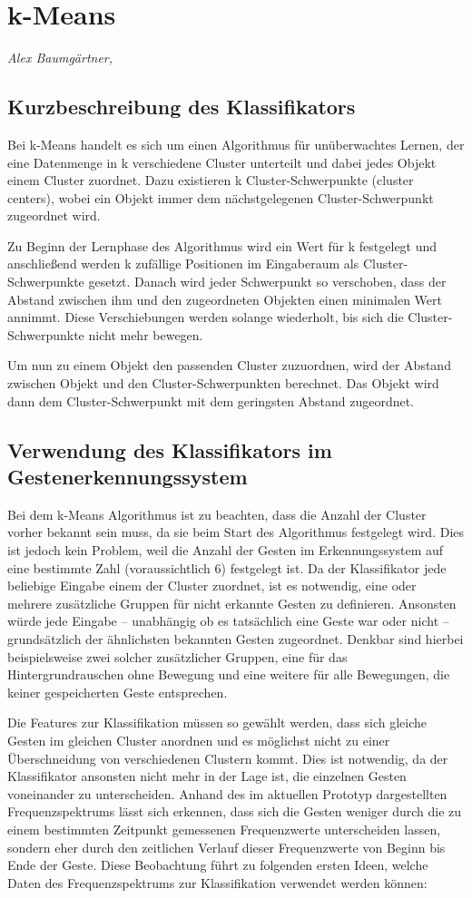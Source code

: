 \section{k-Means}
\textit{Alex Baumgärtner, }
\subsection{Kurzbeschreibung des Klassifikators}
Bei k-Means handelt es sich um einen Algorithmus für unüberwachtes Lernen, der eine Datenmenge in k verschiedene Cluster unterteilt und dabei jedes Objekt einem Cluster zuordnet. Dazu existieren k Cluster-Schwerpunkte (cluster centers), wobei ein Objekt immer dem nächstgelegenen Cluster-Schwerpunkt zugeordnet wird.

Zu Beginn der Lernphase des Algorithmus wird ein Wert für k festgelegt und anschließend werden k zufällige Positionen im Eingaberaum als Cluster-Schwerpunkte gesetzt. Danach wird jeder Schwerpunkt so verschoben, dass der Abstand zwischen ihm und den zugeordneten Objekten einen minimalen Wert annimmt. Diese Verschiebungen werden solange wiederholt, bis sich die Cluster-Schwerpunkte nicht mehr bewegen.

Um nun zu einem Objekt den passenden Cluster zuzuordnen, wird der Abstand zwischen Objekt und den Cluster-Schwerpunkten berechnet. Das Objekt wird dann dem Cluster-Schwerpunkt mit dem geringsten Abstand zugeordnet.


\subsection{Verwendung des Klassifikators im Gestenerkennungssystem}
Bei dem k-Means Algorithmus ist zu beachten, dass die Anzahl der Cluster vorher bekannt sein muss, da sie beim Start des Algorithmus festgelegt wird. Dies ist jedoch kein Problem, weil die Anzahl der Gesten im Erkennungssystem auf eine bestimmte Zahl (voraussichtlich 6) festgelegt ist. Da der Klassifikator jede beliebige Eingabe einem der Cluster zuordnet, ist es notwendig, eine oder mehrere zusätzliche Gruppen für nicht erkannte Gesten zu definieren. Ansonsten würde jede Eingabe – unabhängig ob es tatsächlich eine Geste war oder nicht – grundsätzlich der ähnlichsten bekannten Gesten zugeordnet. Denkbar sind hierbei beispielsweise zwei solcher zusätzlicher Gruppen, eine für das Hintergrundrauschen ohne Bewegung und eine weitere für alle Bewegungen, die keiner gespeicherten Geste entsprechen.

Die Features zur Klassifikation müssen so gewählt werden, dass sich gleiche Gesten im gleichen Cluster anordnen und es möglichst nicht zu einer Überschneidung von verschiedenen Clustern kommt. Dies ist notwendig, da der Klassifikator ansonsten nicht mehr in der Lage ist, die einzelnen Gesten voneinander zu unterscheiden. Anhand des im aktuellen Prototyp dargestellten Frequenzspektrums lässt sich erkennen, dass sich die Gesten weniger durch die zu einem bestimmten Zeitpunkt gemessenen Frequenzwerte unterscheiden lassen, sondern eher durch den zeitlichen Verlauf dieser Frequenzwerte von Beginn bis Ende der Geste. Diese Beobachtung führt zu folgenden ersten Ideen, welche Daten des Frequenzspektrums zur Klassifikation verwendet werden können:

